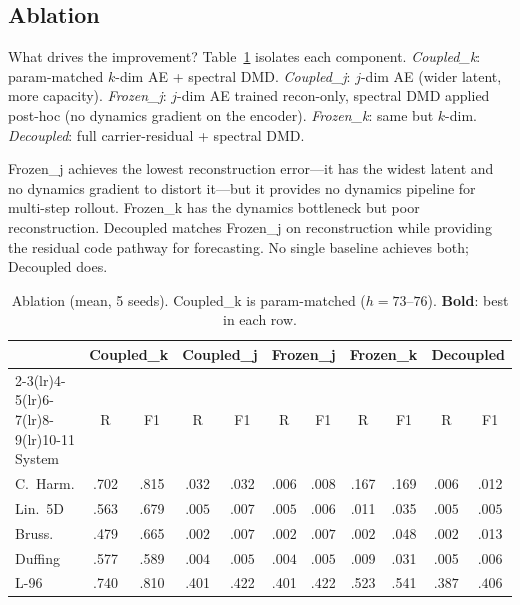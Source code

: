 \documentclass{article}
\begin{document}
\subsection{Ablation}
\label{sec:ablation}

What drives the improvement?  Table~\ref{tab:ablation} isolates each
component.
\emph{Coupled\_k}: param-matched $k$-dim AE + spectral DMD.
\emph{Coupled\_j}: $j$-dim AE (wider latent, more capacity).
\emph{Frozen\_j}: $j$-dim AE trained recon-only, spectral DMD
applied post-hoc (no dynamics gradient on the encoder).
\emph{Frozen\_k}: same but $k$-dim.
\emph{Decoupled}: full carrier-residual + spectral DMD.

Frozen\_j achieves the lowest reconstruction error---it has the
widest latent and no dynamics gradient to distort it---but it provides
no dynamics pipeline for multi-step rollout.
Frozen\_k has the dynamics bottleneck but poor reconstruction.
Decoupled matches Frozen\_j on reconstruction while providing the
residual code pathway for forecasting.  No single baseline achieves
both; Decoupled does.

\begin{table}[H]
\caption{Ablation (mean, 5 seeds).
Coupled\_k is param-matched ($h{=}73$--$76$).
\textbf{Bold}: best in each row.}
\label{tab:ablation}
\centering
\small
\setlength{\tabcolsep}{3pt}
\begin{tabular}{l cc cc cc cc cc}
\toprule
& \multicolumn{2}{c}{Coupled\_k} & \multicolumn{2}{c}{Coupled\_j}
& \multicolumn{2}{c}{Frozen\_j} & \multicolumn{2}{c}{Frozen\_k}
& \multicolumn{2}{c}{Decoupled} \\
\cmidrule(lr){2-3}\cmidrule(lr){4-5}\cmidrule(lr){6-7}\cmidrule(lr){8-9}\cmidrule(lr){10-11}
System & R & F1 & R & F1 & R & F1 & R & F1 & R & F1 \\
\midrule
C.~Harm.
  & .702 & .815
  & .032 & .032
  & $\mathbf{.006}$ & $\mathbf{.008}$
  & .167 & .169
  & $\mathbf{.006}$ & .012 \\
Lin.~5D
  & .563 & .679
  & $\mathbf{.005}$ & .007
  & $\mathbf{.005}$ & .006
  & .011 & .035
  & $\mathbf{.005}$ & $\mathbf{.005}$ \\
Bruss.
  & .479 & .665
  & $\mathbf{.002}$ & $\mathbf{.007}$
  & $\mathbf{.002}$ & $\mathbf{.007}$
  & $\mathbf{.002}$ & .048
  & $\mathbf{.002}$ & .013 \\
Duffing
  & .577 & .589
  & $\mathbf{.004}$ & $\mathbf{.005}$
  & $\mathbf{.004}$ & $\mathbf{.005}$
  & .009 & .031
  & .005 & .006 \\
L-96
  & .740 & .810
  & .401 & .422
  & .401 & .422
  & .523 & .541
  & $\mathbf{.387}$ & $\mathbf{.406}$ \\
\bottomrule
\end{tabular}
\end{table}
\end{document}
